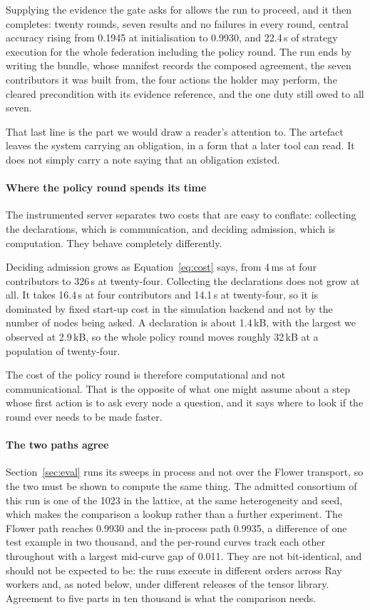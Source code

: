 \documentclass[10pt,conference]{IEEEtran}
\begin{document}
Supplying the evidence the gate asks for allows the run to proceed, and it then
completes: twenty rounds, seven results and no failures in every round, central
accuracy rising from 0.1945 at initialisation to 0.9930, and 22.4\,s of
strategy execution for the whole federation including the policy round. The run
ends by writing the bundle, whose manifest records the composed agreement, the
seven contributors it was built from, the four actions the holder may perform,
the cleared precondition with its evidence reference, and the one duty still
owed to all seven.

That last line is the part we would draw a reader's attention to. The artefact
leaves the system carrying an obligation, in a form that a later tool can read. It does not simply carry a note saying that an obligation existed.

\paragraph{Where the policy round spends its time}
The instrumented server separates two costs that are easy to conflate:
collecting the declarations, which is communication, and deciding admission,
which is computation. They behave completely differently.

Deciding admission grows as Equation~\ref{eq:cost} says, from 4\,ms at four
contributors to 326\,s at twenty-four. Collecting the declarations does not
grow at all. It takes 16.4\,s at four contributors and 14.1\,s at
twenty-four, so it is dominated by fixed start-up cost in the simulation
backend and not by the number of nodes being asked. A declaration is about
1.4\,kB, with the largest we observed at 2.9\,kB, so the whole policy round
moves roughly 32\,kB at a population of twenty-four.

The cost of the policy round is therefore computational and not
communicational. That is the opposite of what one might assume about a step
whose first action is to ask every node a question, and it says where to look
if the round ever needs to be made faster.

\paragraph{The two paths agree}
Section~\ref{sec:eval} runs its sweeps in process and not over the Flower transport, so the two must be shown to compute the same thing. The admitted
consortium of this run is one of the 1023 in the lattice, at the same
heterogeneity and seed, which makes the comparison a lookup rather than a
further experiment. The Flower path reaches 0.9930 and the in-process path
0.9935, a difference of one test example in two thousand, and the per-round
curves track each other throughout with a largest mid-curve gap of 0.011. They
are not bit-identical, and should not be expected to be: the runs execute in
different orders across Ray workers and, as noted below, under different
releases of the tensor library. Agreement to five parts in ten thousand is what
the comparison needs.
\end{document}
